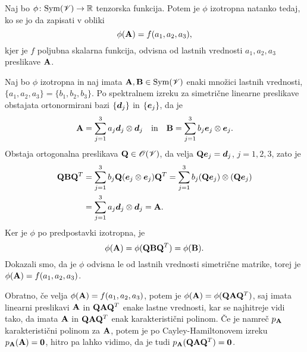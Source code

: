 \begin{izrek} \label{i:prinva}
	Naj bo $\phi\colon\mathrm{Sym}(\mathscr V)\to\mathbb R$ tenzorska funkcija.
	Potem je $\phi$ izotropna natanko tedaj, ko se jo da zapisati v obliki
	\[
		\phi(\mathbf A)=f(a_1,a_2,a_3),
	\]
	kjer je $f$ poljubna skalarna funkcija, odvisna od lastnih vrednosti $a_1,a_2,a_3$
	preslikave $\mathbf A$.
\end{izrek}

\proof
	Naj bo $\phi$ izotropna in naj imata $\mathbf A,\mathbf B\in\mathrm{Sym}(\mathscr V)$
	enaki množici lastnih vrednosti, $\{a_1,a_2,a_3\}=\{b_1,b_2,b_3\}$.
	Po spektralnem izreku za simetrične linearne preslikave
	obstajata ortonormirani bazi $\{\boldsymbol d_j\}$ in $\{\boldsymbol e_j\}$, da je
	\[
		\mathbf A=\sum_{j=1}^3 a_j\boldsymbol d_j\otimes\boldsymbol d_j\quad\textrm{in}\quad
		\mathbf B=\sum_{j=1}^3 b_j\boldsymbol e_j\otimes\boldsymbol e_j.
	\]
	Obstaja ortogonalna preslikava $\mathbf Q\in\mathscr{O}(\mathscr V)$,
	da velja $\mathbf Q\boldsymbol e_j=\boldsymbol d_j$, $j=1,2,3$, zato je
	\begin{align*}
		\mathbf Q\mathbf B\mathbf Q^T&=\sum_{j=1}^3 b_j\mathbf Q(\boldsymbol e_j\otimes\boldsymbol e_j)\mathbf Q^T
		=\sum_{j=1}^3 b_j(\mathbf Q\boldsymbol e_j)\otimes(\mathbf Q\boldsymbol e_j) \\
		&=\sum_{j=1}^3 a_j\boldsymbol d_j\otimes\boldsymbol d_j=\mathbf A.
	\end{align*}
	Ker je $\phi$ po predpostavki izotropna, je
	\[
		\phi(\mathbf A)=\phi(\mathbf Q\mathbf B\mathbf Q^T)=\phi(\mathbf B).
	\]
	Dokazali smo, da je $\phi$ odvisna le od lastnih vrednosti simetrične matrike,
	torej je $\phi(\mathbf A)=f(a_1,a_2,a_3)$.
	
	Obratno, če velja $\phi(\mathbf A)=f(a_1,a_2,a_3)$, potem je $\phi(\mathbf A)=\phi(\mathbf Q\mathbf A\mathbf Q^T)$,
	saj imata linearni preslikavi $\mathbf A$ in $\mathbf Q\mathbf A\mathbf Q^T$ enake lastne vrednosti,
	kar se najhitreje vidi tako, da imata $\mathbf A$ in $\mathbf Q\mathbf A\mathbf Q^T$ enak karakteristični polinom.
	Če je namreč $p_{\mathbf A}$ karakteristični polinom za $\mathbf A$, potem je po Cayley-Hamiltonovem izreku
	$p_{\mathbf A}(\mathbf A)=\mathbf 0$, hitro pa lahko vidimo, da je tudi $p_{\mathbf A}(\mathbf Q\mathbf A\mathbf Q^T)=\mathbf 0$.
\endproof

